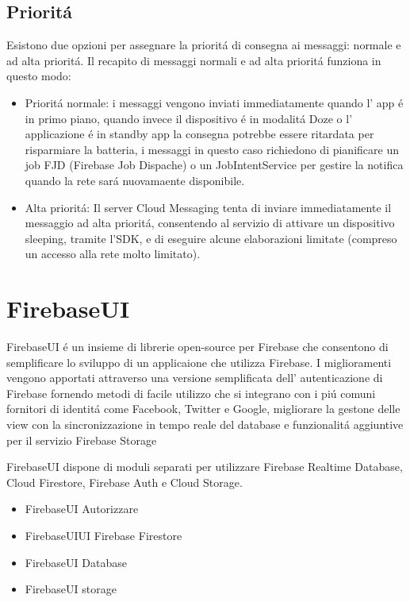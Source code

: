 \subsection{Priorit\'a}
Esistono due opzioni per assegnare la priorit\'a di consegna ai messaggi: normale e ad alta priorit\'a. Il recapito di messaggi normali e ad alta priorit\'a funziona in questo modo:
\begin{itemize}
\item Priorit\'a normale: i messaggi vengono inviati immediatamente quando l' app \'e in primo piano, quando invece il dispositivo \'e in modalit\'a Doze o l' applicazione \'e in standby app la consegna potrebbe essere ritardata per risparmiare la batteria, i messaggi in questo caso richiedono di pianificare un job FJD (Firebase Job Dispache) o un JobIntentService per gestire la notifica quando la rete sar\'a nuovamaente disponibile.
\item Alta priorit\'a: Il server Cloud Messaging tenta di inviare immediatamente il messaggio ad alta priorit\'a, consentendo al servizio di attivare un dispositivo sleeping, tramite l'SDK, e di eseguire alcune elaborazioni limitate (compreso un accesso alla rete molto limitato).
\end{itemize}









\section{FirebaseUI}                 %
FirebaseUI \'e un insieme di librerie open-source per Firebase che consentono di semplificare lo sviluppo di un applicaione che utilizza Firebase.
I miglioramenti vengono apportati attraverso una versione semplificata dell' autenticazione di Firebase fornendo metodi di facile utilizzo che si integrano con i pi\'u comuni fornitori di identit\'a come Facebook, Twitter e Google, migliorare la gestone delle view con la sincronizzazione in tempo reale del database e funzionalit\'a aggiuntive per il servizio Firebase Storage

FirebaseUI dispone di moduli separati per utilizzare Firebase Realtime Database, Cloud Firestore, Firebase Auth e Cloud Storage.
\begin{itemize}
  \item FirebaseUI Autorizzare
  \item  FirebaseUIUI Firebase Firestore
  \item  FirebaseUI Database
  \item  FirebaseUI storage
\end{itemize}


